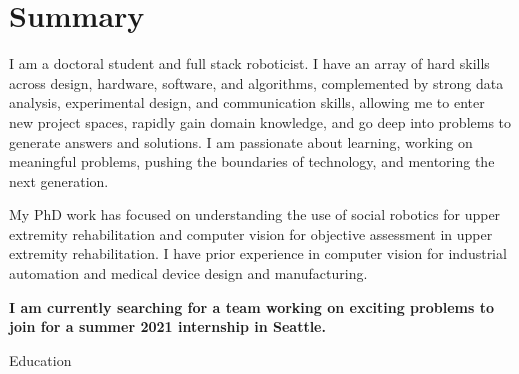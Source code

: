 \documentclass[10pt, letter]{article}
\begin{document}


\section*{Summary}
\hspace*{\fill}\begin{minipage}{\textwidth-\cvindent}
I am a doctoral student and full stack roboticist.
I have an array of hard skills across design, hardware, software, and algorithms, complemented by strong data analysis, experimental design, and communication skills, allowing me to enter new project spaces, rapidly gain domain knowledge, and go deep into problems to generate answers and solutions. 
I am passionate about learning, working on meaningful problems, pushing the boundaries of technology, and mentoring the next generation.  

My PhD work has focused on understanding the use of social robotics for upper extremity rehabilitation and computer vision for objective assessment in upper extremity rehabilitation.
I have prior experience in computer vision for industrial automation and medical device design and manufacturing. 

\textbf{I am currently searching for a team working on exciting problems to join for a summer 2021 internship in Seattle.}
\end{minipage}

\begin{cvsection}{Education}




\end{cvsection}
\end{document}
